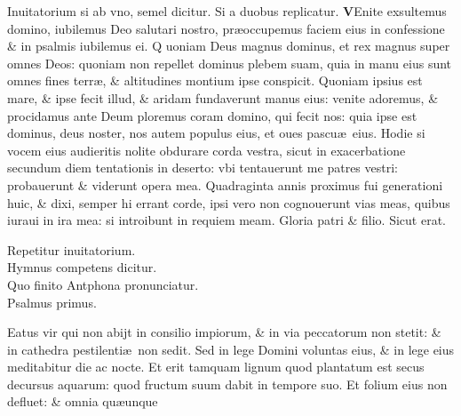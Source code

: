 \documentclass[a5paper,10pt]{book}
\def\ae{æ}
\begin{document}
\begin{multicols*}{2}
\newline
\color{red} Inuitatorium si ab vno, semel dicitur. Si a duobus replicatur. \color{black}
\vspace{-.25em}
\lettrine[lines=2]{\bfseries \color{red} V}{}Enite exsultemus domino, iubilemus Deo salutari nostro, pr\ae occupemus faciem eius in confessione \& in psalmis iubilemus ei.
\newline
\color{red} Q\color{black}
uoniam Deus magnus dominus, et rex magnus super omnes %
Deos: quoniam non repellet dominus plebem suam, quia in manu eius sunt omnes fines terr\ae , \& altitudines montium ipse conspicit.
\newline
\color{red} Q\color{black}uoniam ipsius est mare, \& ipse fecit illud, \& aridam fundaverunt manus eius: venite adoremus, \& procidamus ante Deum ploremus coram domino, qui fecit nos: quia ipse est dominus, deus noster, nos autem populus eius, et oues pascu\ae \ eius.
\newline
\color{red} H\color{black}odie si vocem eius audieritis nolite obdurare corda vestra, sicut in exacerbatione secundum diem tentationis in deserto: vbi tentauerunt me patres vestri: probauerunt \& viderunt opera mea.
\newline
\color{red} Q\color{black}uadraginta annis proximus fui generationi huic, \& dixi, semper hi errant corde, ipsi vero non cognouerunt vias meas, quibus iuraui in ira mea: si introibunt in requiem meam.
\newline
\color{red} G\color{black}loria patri \& filio. Sicut erat.
\vspace{-1em}
\begin{center} \color{red}
Repetitur inuitatorium.\\
Hymnus competens dicitur.\\
Quo finito Antphona pronunciatur.\\
Psalmus primus.
\end{center}
\vspace{-1em}
Eatus vir qui non abijt in consilio impiorum, \& in via peccatorum non stetit: \& in cathedra pestilenti\ae \ non sedit.
\newline \color{red} S\color{black}ed in lege Domini voluntas eius, \& in lege eius meditabitur die ac nocte.
\newline \color{red} E\color{black}t erit tamquam lignum quod plantatum est secus decursus aquarum: quod fructum suum dabit in tempore suo.
\newline \color{red} E\color{black}t folium eius non defluet: \& omnia qu\ae unque %

\end{multicols*}
\end{document}
